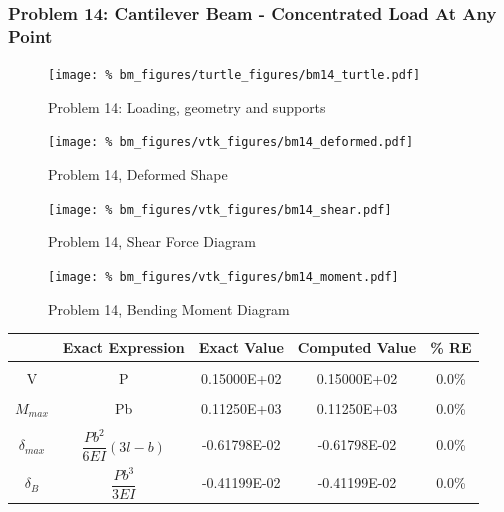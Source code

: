 \subsubsection{Problem 14: Cantilever Beam - Concentrated Load At Any Point}
\begin{figure}[h]
    \texttt{[image: \%
                            bm\_figures/turtle\_figures/bm14\_turtle.pdf]}
    \centering
    \caption{Problem 14: Loading, geometry and supports}
    \label{fig:bm14_turtle}
\end{figure}


\begin{figure}[!htb]
    \texttt{[image: \%
                     bm\_figures/vtk\_figures/bm14\_deformed.pdf]}
    \centering
    \caption{Problem 14, Deformed Shape}
    \label{fig:bm14_deformed}
\end{figure}
\begin{figure}[!htb]
    \texttt{[image: \%
                     bm\_figures/vtk\_figures/bm14\_shear.pdf]}
    \centering
    \caption{Problem 14, Shear Force Diagram}
    \label{fig:bm14_shear}
\end{figure}
\begin{figure}[!htb]
    \texttt{[image: \%
                     bm\_figures/vtk\_figures/bm14\_moment.pdf]}
    \centering
    \caption{Problem 14, Bending Moment Diagram}
    \label{fig:bm14_moment}
\end{figure}
\begin{table}[h!]
\centering
\begin{tabular}{ c| c c c c }
    & Exact Expression & Exact Value & Computed Value & \% RE \\ \hline \\
    V   & P & 0.15000E+02 & 0.15000E+02 & 0.0\% \\ \\
    $M_{max}$ & Pb & 0.11250E+03 & 0.11250E+03 & 0.0\% \\ \\
    $\delta_{max}$ & $\dfrac{Pb^2}{6EI}(3l-b)$ & -0.61798E-02 & -0.61798E-02 & 0.0\% \\
    $\delta_{B}$ & $\dfrac{Pb^3}{3EI}$ & -0.41199E-02 & -0.41199E-02 & 0.0\% \\
\end{tabular}
\end{table}

%
%

\clearpage

